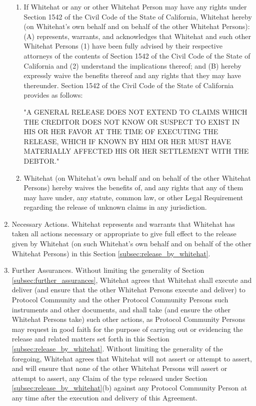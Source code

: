 \documentclass{article}
\begin{document}
\begin{enumerate}
          \begin{enumerate}
              \item If Whitehat or any or other Whitehat Person may have any rights under Section 1542 of the Civil Code of the State of California, Whitehat hereby (on Whitehat's own behalf and on behalf of the other Whitehat Persons): (A) represents, warrants, and acknowledges that Whitehat and such other Whitehat Persons (1) have been fully advised by their respective attorneys of the contents of Section 1542 of the Civil Code of the State of California and (2) understand the implications thereof; and (B) hereby expressly waive the benefits thereof and any rights that they may have thereunder. Section 1542 of the Civil Code of the State of California provides as follows:

                    "A GENERAL RELEASE DOES NOT EXTEND TO CLAIMS WHICH THE CREDITOR DOES NOT KNOW OR SUSPECT TO EXIST IN HIS OR HER FAVOR AT THE TIME OF EXECUTING THE RELEASE, WHICH IF KNOWN BY HIM OR HER MUST HAVE MATERIALLY AFFECTED HIS OR HER SETTLEMENT WITH THE DEBTOR."

              \item Whitehat (on Whitehat's own behalf and on behalf of the other Whitehat Persons) hereby waives the benefits of, and any rights that any of them may have under, any statute, common law, or other Legal Requirement regarding the release of unknown claims in any jurisdiction.

          \end{enumerate}

    \item Necessary Actions. Whitehat represents and warrants that Whitehat has taken all actions necessary or appropriate to give full effect to the release given by Whitehat (on such Whitehat's own behalf and on behalf of the other Whitehat Persons) in this Section \ref{subsec:release_by_whitehat}.

    \item Further Assurances. Without limiting the generality of Section \ref{subsec:further_assurances}, Whitehat agrees that Whitehat shall execute and deliver (and ensure that the other Whitehat Persons execute and deliver) to Protocol Community and the other Protocol Community Persons such instruments and other documents, and shall take (and ensure the other Whitehat Persons take) such other actions, as Protocol Community Persons may request in good faith for the purpose of carrying out or evidencing the release and related matters set forth in this Section \ref{subsec:release_by_whitehat}. Without limiting the generality of the foregoing, Whitehat agrees that Whitehat will not assert or attempt to assert, and will ensure that none of the other Whitehat Persons will assert or attempt to assert, any Claim of the type released under Section \ref{subsec:release_by_whitehat}(b) against any Protocol Community Person at any time after the execution and delivery of this Agreement.

\end{enumerate}
\end{document}
